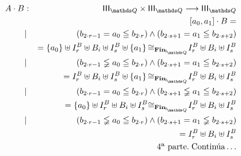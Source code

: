 \documentclass[final,12pt,a4paper,twoside,fleqn]{extbook}
\newcommand{\fromto}{\ensuremath{\longrightarrow}}
\newcommand{\set}[1]{\ensuremath{\left\lbrace{#1}\right\rbrace}}
\theoremstyle{definition}
\theoremstyle{remark}
\begin{document}
\begin{eqnarray}
A \cdot B &:& \IIIQ \times \IIIQ \fromto \IIIQ\\
&&\left[a_0,a_1\right] \cdot B =\\
&|&{ \left( b_{{2 \cdot r} - 1} = a_0 \leqq b_{ {2 \cdot
r} } \right) } \land {\left( b_{{2\cdot s} + 1} = a_1 \leqq b_{ {2
\cdot s} + 2 } \right) } \\
\qquad&&= \set{a_0} \uplus I_r^B \uplus B_i \uplus I_s^B \uplus \set{a_1}
{\cong}_{\mathbf{Fin}_{\IQ}} I_r^B \uplus B_i \uplus I_s^B\\
&|&{ \left( b_{{2 \cdot r} - 1} \lneqq a_0 \leqq b_{ {2 \cdot
r} } \right) } \land {\left( b_{{2\cdot s} + 1} = a_1 \leqq b_{ {2
\cdot s} + 2 } \right) } \\
\qquad&&= I_r^B \uplus B_i \uplus I_s^B \uplus \set{a_1} 
{\cong}_{\mathbf{Fin}_{\IQ}} I_r^B \uplus B_i \uplus I_s^B\\
&|&{ \left( b_{{2 \cdot r} - 1} = a_0 \leqq b_{ {2 \cdot
r} } \right) } \land {\left( b_{{2\cdot s} + 1} \lneqq a_1 \leqq b_{ {2
\cdot s} + 2 } \right) } \\
\qquad&&= \set{a_0} \uplus I_r^B \uplus B_i \uplus I_s^B
{\cong}_{\mathbf{Fin}_{\IQ}}
I_r^B \uplus B_i \uplus I_s^B\\
&|&{ \left( b_{{2 \cdot r} - 1} \lneqq a_0 \leqq b_{ {2 \cdot
r} } \right) } \land {\left( b_{{2\cdot s} + 1} = a_1 \lneqq b_{ {2
\cdot s} + 2 } \right) } \\
\qquad&&= I_r^B \uplus B_i \uplus I_s^B\\ \nonumber
&&\text{4ª parte.}\;\text{Continúa}\ldots
\end{eqnarray}
\end{document}
